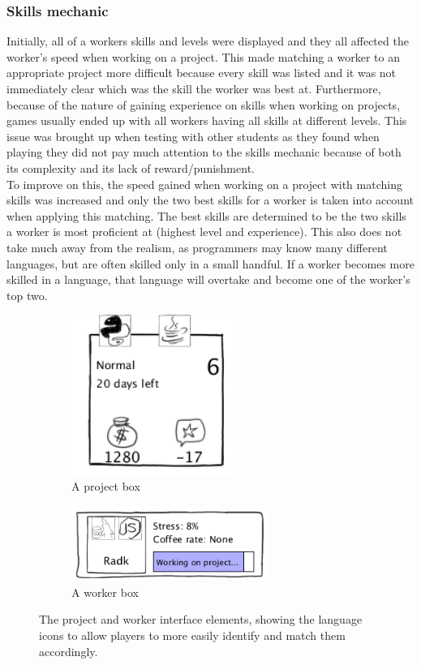 \documentclass[11pt]{article}
\newcommand{\n}[0]{\\[\baselineskip]}
\begin{document}
\subsubsection{Skills mechanic}\label{sec:testing-skills}
Initially, all of a workers skills and levels were displayed and they all affected the worker's speed when working on a project. This made matching a worker to an appropriate project more difficult because every skill was listed and it was not immediately clear which was the skill the worker was best at. Furthermore, because of the nature of gaining experience on skills when working on projects, games usually ended up with all workers having all skills at different levels. This issue was brought up when testing with other students as they found when playing they did not pay much attention to the skills mechanic because of both its complexity and its lack of reward/punishment. 
\n
To improve on this, the speed gained when working on a project with matching skills was increased and only the two best skills for a worker is taken into account when applying this matching. The best skills are determined to be the two skills a worker is most proficient at (highest level and experience). This also does not take much away from the realism, as programmers may know many different languages, but are often skilled only in a small handful. If a worker becomes more skilled in a language, that language will overtake and become one of the worker's top two. 
\begin{figure}[H]
\centering
\begin{subfigure}{.5\textwidth}
\centering
\includegraphics[width=0.6\textwidth, keepaspectratio]{imgs/project.png}
\caption{A project box}
\end{subfigure}%
\begin{subfigure}{.5\textwidth}
\centering
\includegraphics[width=0.7\textwidth, keepaspectratio]{imgs/worker.png}
\caption{A worker box}
\end{subfigure}
\caption{The project and worker interface elements, showing the language icons to allow players to more easily identify and match them accordingly.}
\end{figure}
\end{document}
